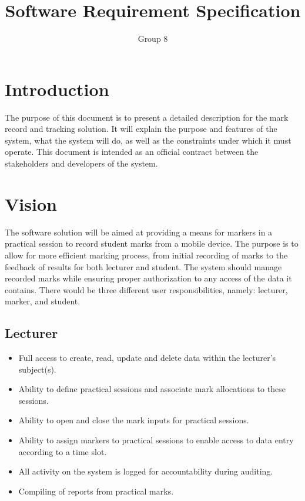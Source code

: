 \documentclass[a4paper]{article}
\begin{document}
	\title{\Huge{Software Requirement Specification}}
	\author{Group 8}
	\maketitle

	\section{Introduction}

		The purpose of this document is to present a detailed description for the mark record and tracking solution. It will explain the purpose and features of the system, what the system will do, as well as the constraints under which it must operate. This document is intended as an official contract between the stakeholders and developers of the system.

	\section{Vision}

		The software solution will be aimed at providing a means for markers in a practical session to record student marks from a mobile device. The purpose is to allow for more efficient marking process, from initial recording of marks to the feedback of results for both lecturer and student. The system should manage recorded marks while ensuring proper authorization to any access of the data it contains. There would be three different user responsibilities, namely: lecturer, marker, and student.
		
		\subsection{Lecturer}
			\begin{itemize}
				\item	Full access to create, read, update and delete data within the lecturer's subject(s).
				\item	Ability to define practical sessions and associate mark allocations to these sessions.
				\item	Ability to open and close the mark inputs for practical sessions.
				\item	Ability to assign markers to practical sessions to enable access to data entry according to a time slot.
				\item	All activity on the system is logged for accountability during auditing.
				\item	Compiling of reports from practical marks.
			\end{itemize}
\end{document}
